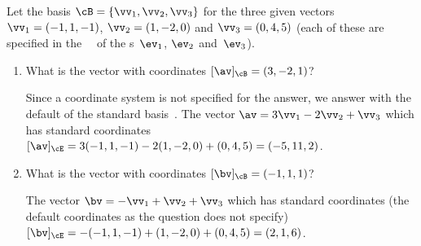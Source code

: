 \begin{example} \label{eg:}
Let the basis \(\cB=\{\vv_1,\vv_2,\vv_3\}\) for the three given vectors \(\vv_1=(-1,1,-1)\), \(\vv_2=(1,-2,0)\) and \(\vv_3=(0,4,5)\) (each of these are specified in the ~\cE\ of the s~\(\ev_1\), \(\ev_2\) and~\(\ev_3\)).
\begin{enumerate}
\item What is the vector with coordinates \([\av]_\cB=(3,-2,1)\)?
\begin{solution} 
Since a coordinate system is not specified for the answer, we answer with the default of the standard basis~\cE.
The vector \(\av=3\vv_1-2\vv_2+\vv_3\) which has standard coordinates 
\([\av]_\cE=3(-1,1,-1)-2(1,-2,0)+(0,4,5)=(-5,11,2)\).
\end{solution}

\item What is the vector with coordinates \([\bv]_\cB=(-1,1,1)\)?
\begin{solution} 
The vector \(\bv=-\vv_1+\vv_2+\vv_3\) which has standard coordinates (the default coordinates as the question does not specify) 
\([\bv]_\cE=-(-1,1,-1)+(1,-2,0)+(0,4,5)=(2,1,6)\).
\end{solution}


\end{enumerate}
\end{example}

